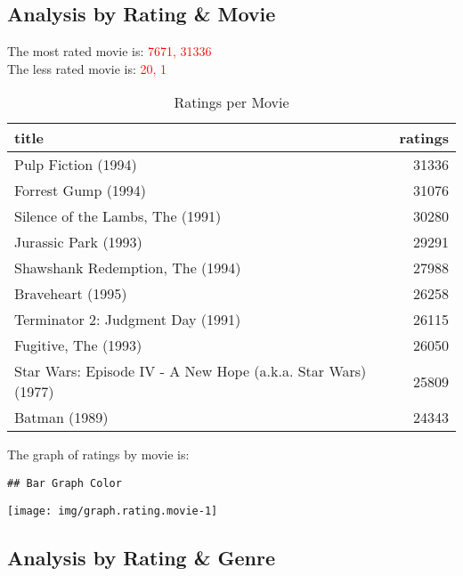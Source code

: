 \documentclass[]{article}
\begin{document}
\hypertarget{analysis-by-rating-movie}{%
\subsection{Analysis by Rating \&
Movie}\label{analysis-by-rating-movie}}

The most rated movie is: \textcolor{red}{7671, 31336}\\
The less rated movie is: \textcolor{red}{20, 1}

\begin{table}[!h]

\caption{\label{tab:table.rating.movie}Ratings per Movie}
\centering
\begin{tabular}{lr}
\toprule
title & ratings\\
\midrule
\rowcolor{gray!6}  Pulp Fiction (1994) & 31336\\
Forrest Gump (1994) & 31076\\
\rowcolor{gray!6}  Silence of the Lambs, The (1991) & 30280\\
Jurassic Park (1993) & 29291\\
\rowcolor{gray!6}  Shawshank Redemption, The (1994) & 27988\\
\addlinespace
Braveheart (1995) & 26258\\
\rowcolor{gray!6}  Terminator 2: Judgment Day (1991) & 26115\\
Fugitive, The (1993) & 26050\\
\rowcolor{gray!6}  Star Wars: Episode IV - A New Hope (a.k.a. Star Wars) (1977) & 25809\\
Batman (1989) & 24343\\
\bottomrule
\end{tabular}
\end{table}

The graph of ratings by movie is:\\
\tiny

\begin{verbatim}
## Bar Graph Color
\end{verbatim}

\begin{center}\texttt{[image: img/graph.rating.movie-1]} \end{center}
\normalsize

\hypertarget{analysis-by-rating-genre}{%
\subsection{Analysis by Rating \&
Genre}\label{analysis-by-rating-genre}}
\end{document}
